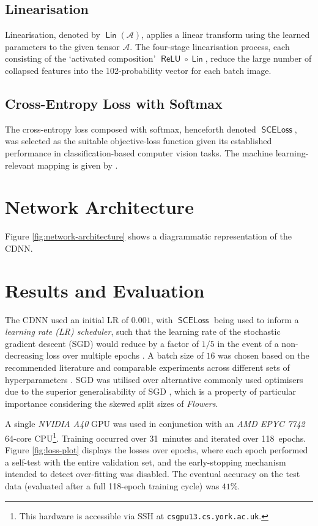 \documentclass[journal]{IEEEtran}
\DeclareMathOperator\relu{\mathsf{ReLU}}
\DeclareMathOperator\linear{\mathsf{Lin}}
\DeclareMathOperator\loss{\mathsf{SCELoss}}
\newcommand\networkperformance{41}
\newcommand\trainingtime{31}
\newcommand\trainingepochcount{118}
\begin{document}
\subsection{Linearisation}
Linearisation, denoted by $\linear(\mathcal{A})$, applies a linear transform
using the learned parameters to the given tensor $\mathcal{A}$. The four-stage
linearisation process, each consisting of the `activated composition' $\relu
\circ \linear$, reduce the large number of collapsed features into the
102-probability vector for each batch image.

\subsection{Cross-Entropy Loss with Softmax}
The cross-entropy loss composed with softmax, henceforth denoted $\loss$, was
selected as the suitable objective-loss function given its established
performance in classification-based computer vision tasks. The machine
learning-relevant mapping is given by \cite{Jie:2018}.

\section{Network Architecture}
Figure \ref{fig:network-architecture} shows a diagrammatic representation of the
CDNN.

\section{Results and Evaluation}
The CDNN used an initial LR of $0.001$, with $\loss$ being used to inform a
\emph{learning rate (LR) scheduler}, such that the learning rate of the
stochastic gradient descent (SGD) would reduce by a factor of $1/5$ in the event
of a non-decreasing loss over multiple epochs \cite{Konar:2020}. A batch size of
$16$ was chosen based on the recommended literature and comparable experiments
across different sets of hyperparameters \cite{Kandel:2020}. SGD was utilised
over alternative commonly used optimisers due to the superior generalisability
of SGD \cite{Hardt:2016}, which is a property of particular importance
considering the skewed split sizes of \emph{Flowers}.

A single \emph{NVIDIA A40} GPU was used in conjunction with an \emph{AMD EPYC
7742} 64-core CPU\footnote{This hardware is accessible via SSH at
\texttt{csgpu13.cs.york.ac.uk}.}. Training occurred over \trainingtime\ minutes
and iterated over \trainingepochcount\ epochs. Figure \ref{fig:loss-plot}
displays the losses over epochs, where each epoch performed a self-test with the
entire validation set, and the early-stopping mechanism intended to detect
over-fitting was disabled. The eventual accuracy on the test data (evaluated
after a full \trainingepochcount{}-epoch training cycle) was
$\networkperformance$\%.
\end{document}
